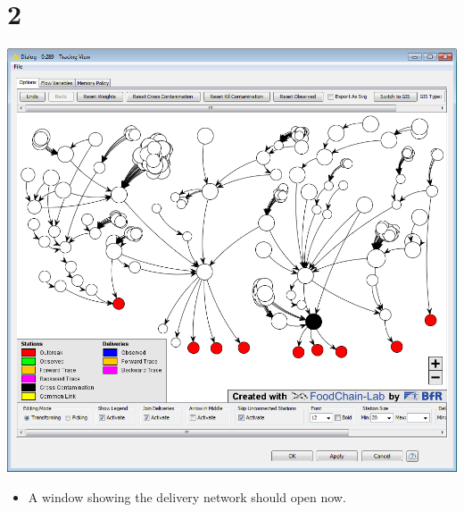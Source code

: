 \documentclass{beamer}
\begin{document}
\section{2}
\begin{frame}
	\begin{center}
  		\includegraphics[height=0.6\textheight]{2.png}
	\end{center}
	\begin{itemize}
		\item A window showing the delivery network should open now.
	\end{itemize}
\end{frame}
\end{document}
